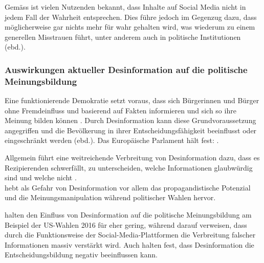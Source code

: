 \documentclass[12pt,a4paper]{article}        %
\begin{document}
Gemäss \textcite[183]{weidner_fake_2019} ist vielen Nutzenden bekannt, dass Inhalte auf Social Media nicht in jedem Fall der Wahrheit entsprechen. Dies führe jedoch im Gegenzug dazu, dass möglicherweise gar nichts mehr für wahr gehalten wird, was wiederum zu einem generellen Misstrauen führt, unter anderem auch in politische Institutionen (ebd.).

\subsubsection{Auswirkungen aktueller Desinformation auf die politische Meinungsbildung}
Eine funktionierende Demokratie setzt voraus, dass sich Bürgerinnen und Bürger ohne Fremdeinfluss und basierend auf Fakten informieren und sich so ihre Meinung bilden können \parencites[26]{vogler_wahrnehmung_2021}[1]{peng_agenda_2023}. Durch Desinformation kann diese Grundvoraussetzung angegriffen und die Bevölkerung in ihrer Entscheidungsfähigkeit beeinflusst oder eingeschränkt werden (ebd.).
Das Europäische Parlament hält fest:  \parencite[13]{european_parliament_directorate-general_for_external_policies_of_the_union_impact_2021} \parencites[vgl.\ auch][16]{reuter_fake_2019}[26]{vogler_wahrnehmung_2021}[19]{grujic_warnhinweise_2024}{schmidt_meinungsbildung_2022}.

Allgemein führt eine weitreichende Verbreitung von Desinformation dazu, dass es Rezipierenden schwerfällt, zu unterscheiden, welche Informationen glaubwürdig sind und welche nicht \parencite[3697]{weikmann_visual_2023}.\\
\Textcite[170]{wahl_fake_2021} hebt als Gefahr von Desinformation vor allem das propagandistische Potenzial und die Meinungsmanipulation während politischer Wahlen hervor.

\pagebreak
\textcite{allcott_social_2017} halten den Einfluss von Desinformation auf die politische Meinungsbildung am Beispiel der US-Wahlen 2016 für eher gering, während \textcite[1095]{lazer_science_2018} darauf verweisen, dass durch die Funktionsweise der Social-Media-Plattformen die Verbreitung falscher Informationen massiv verstärkt wird. Auch \textcite[26]{vogler_wahrnehmung_2021} halten fest, dass Desinformation die Entscheidungsbildung negativ beeinflussen kann.
\end{document}
